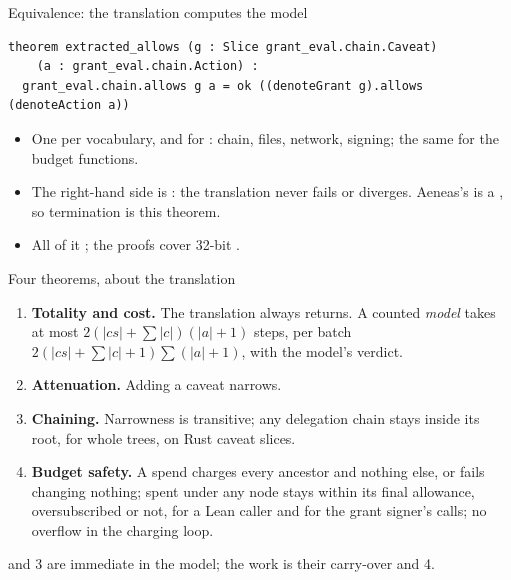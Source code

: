 \documentclass[aspectratio=169,11pt]{beamer}
\begin{document}
\begin{frame}[fragile]{Equivalence: the translation computes the model}
\begin{lstlisting}[language=Lean]
theorem extracted_allows (g : Slice grant_eval.chain.Caveat)
    (a : grant_eval.chain.Action) :
  grant_eval.chain.allows g a = ok ((denoteGrant g).allows (denoteAction a))
\end{lstlisting}
  \begin{itemize}
    \item One per vocabulary, and for : chain,
      files, network,
      signing; the same for the budget
      functions.
    \item The right-hand side is : the translation never fails or
      diverges. Aeneas's  is a
      , so termination is this theorem.
    \item All of it \translationtrust; the proofs cover 32-bit .
  \end{itemize}
\end{frame}

\begin{frame}{Four theorems, about the translation}
  \small
  \begin{enumerate}
    \item \textbf{Totality and cost.} The translation always returns. A
      counted \emph{model} takes at most $2(|cs| + \sum|c|)(|a| +
      1)$ steps, per batch $2(|cs| + \sum|c| + 1)\sum(|a| +
      1)$, with the model's verdict.
    \item \textbf{Attenuation.} Adding a caveat narrows.
    \item \textbf{Chaining.} Narrowness is transitive; any
      delegation chain stays inside its root, for
      whole trees, on Rust caveat
      slices.
    \item \textbf{Budget safety.} A spend charges every
      ancestor and nothing
      else, or fails changing
      nothing; spent under any node stays within its
      final allowance, oversubscribed or not, for a Lean caller
      and for the grant signer's calls; no
      overflow in the charging loop.
  \end{enumerate}
   and 3 are immediate in the model; the work is their carry-over and 4.
\end{frame}
\end{document}
